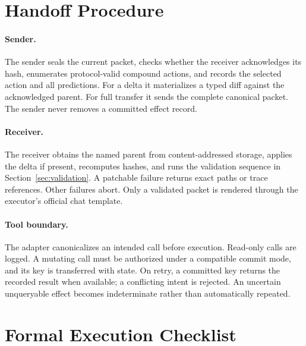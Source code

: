 \documentclass[10pt]{article}
\begin{document}
\section{Handoff Procedure}
\label{app:procedure}

\paragraph{Sender.}
The sender seals the current packet, checks whether the receiver acknowledges
its hash, enumerates protocol-valid compound actions, and records the selected
action and all predictions. For a delta it materializes a typed diff against
the acknowledged parent. For full transfer it sends the complete canonical
packet. The sender never removes a committed effect record.

\paragraph{Receiver.}
The receiver obtains the named parent from content-addressed storage, applies
the delta if present, recomputes hashes, and runs the validation sequence in
Section~\ref{sec:validation}. A patchable failure returns exact paths or trace
references. Other failures abort. Only a validated packet is rendered through
the executor's official chat template.

\paragraph{Tool boundary.}
The adapter canonicalizes an intended call before execution. Read-only calls
are logged. A mutating call must be authorized under a compatible commit mode,
and its key is transferred with state. On retry, a committed key returns the
recorded result when available; a conflicting intent is rejected. An
uncertain unqueryable effect becomes indeterminate rather than automatically
repeated.

\section{Formal Execution Checklist}
\label{app:checklist}
\end{document}
